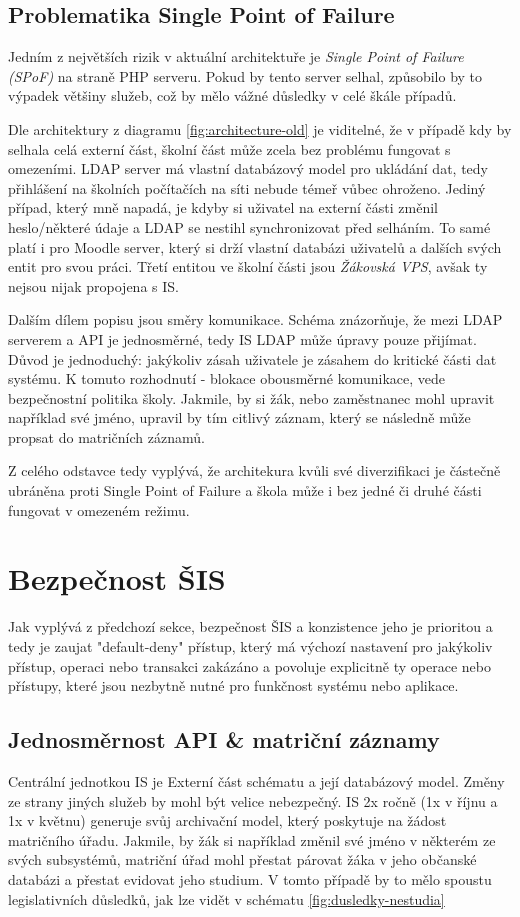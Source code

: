 \documentclass[FM,Proj]{tulthesis}
\begin{document}
\subsection*{Problematika Single Point of Failure}

Jedním z největších rizik v aktuální architektuře je \textit{Single Point of Failure (SPoF)} na straně PHP serveru. 
Pokud by tento server selhal, způsobilo by to výpadek většiny služeb, což by mělo vážné důsledky v celé škále případů. 

Dle architektury z diagramu \ref{fig:architecture-old} je viditelné, že v případě kdy by selhala celá externí část,
školní část může zcela bez problému fungovat s omezeními. LDAP server má vlastní databázový model pro ukládání dat, tedy
přihlášení na školních počítačích na síti nebude témeř vůbec ohroženo. Jediný případ, který mně napadá, je kdyby si uživatel
na externí části změnil heslo/některé údaje a LDAP se nestihl synchronizovat před selháním. To samé platí i pro Moodle
server, který si drží vlastní databázi uživatelů a dalších svých entit pro svou práci.
Třetí entitou ve školní části jsou \textit{Žákovská VPS}, avšak ty nejsou nijak propojena s IS.

Dalším dílem popisu jsou směry komunikace. Schéma znázorňuje, že mezi LDAP serverem a API je jednosměrné, tedy IS
LDAP může úpravy pouze přijímat. Důvod je jednoduchý: jakýkoliv zásah uživatele je zásahem do kritické části 
dat systému. K tomuto rozhodnutí - blokace obousměrné komunikace, vede bezpečnostní politika školy. Jakmile,
by si žák, nebo zaměstnanec mohl upravit například své jméno, upravil by tím citlivý záznam, který se následně
může propsat do matričních záznamů.

Z celého odstavce tedy vyplývá, že architekura kvůli své diverzifikaci je částečně ubráněna proti Single Point of Failure
a škola může i bez jedné či druhé části fungovat v omezeném režimu.

\section{Bezpečnost ŠIS}
Jak vyplývá z předchozí sekce, bezpečnost ŠIS a konzistence jeho je prioritou a tedy je
zaujat "default-deny" přístup, který má výchozí nastavení pro jakýkoliv přístup, operaci
nebo transakci zakázáno a povoluje explicitně ty operace nebo přístupy, které jsou
nezbytně nutné pro funkčnost systému nebo aplikace.

\subsection*{Jednosměrnost API \& matriční záznamy}  
Centrální jednotkou IS je Externí část schématu a její databázový model. Změny ze strany jiných služeb by mohl
být velice nebezpečný. IS 2x ročně (1x v říjnu a 1x v květnu) generuje svůj archivační model, který poskytuje
na žádost matričního úřadu.
Jakmile, by žák si například změnil své jméno v některém ze svých subsystémů, matriční úřad mohl přestat
párovat žáka v jeho občanské databázi a přestat evidovat jeho studium. V tomto případě by to mělo spoustu 
legislativních důsledků, jak lze vidět v schématu \ref{fig:dusledky-nestudia}
\end{document}
